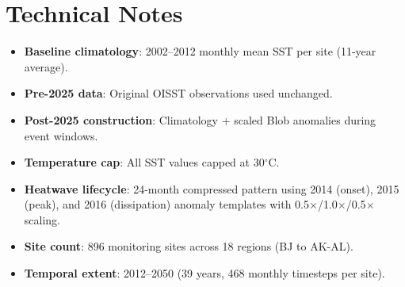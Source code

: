\documentclass[11pt,a4paper]{article}
\begin{document}
\section*{Technical Notes}

\begin{itemize}
    \item \textbf{Baseline climatology}: 2002--2012 monthly mean SST per site (11-year average).
    \item \textbf{Pre-2025 data}: Original OISST observations used unchanged.
    \item \textbf{Post-2025 construction}: Climatology + scaled Blob anomalies during event windows.
    \item \textbf{Temperature cap}: All SST values capped at 30$^\circ$C.
    \item \textbf{Heatwave lifecycle}: 24-month compressed pattern using 2014 (onset), 2015 (peak), and 2016 (dissipation) anomaly templates with 0.5$\times$/1.0$\times$/0.5$\times$ scaling.
    \item \textbf{Site count}: 896 monitoring sites across 18 regions (BJ to AK-AL).
    \item \textbf{Temporal extent}: 2012--2050 (39 years, 468 monthly timesteps per site).
\end{itemize}
\end{document}
